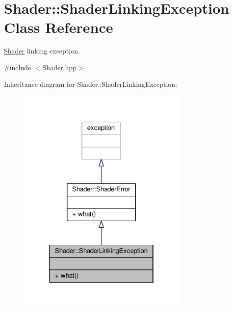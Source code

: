 \hypertarget{class_shader_1_1_shader_linking_exception}{}\section{Shader\+:\+:Shader\+Linking\+Exception Class Reference}
\label{class_shader_1_1_shader_linking_exception}


\hyperlink{class_shader}{Shader} linking exception.  




{\ttfamily \#include $<$Shader.\+hpp$>$}



Inheritance diagram for Shader\+:\+:Shader\+Linking\+Exception\+:
\nopagebreak
\begin{figure}[H]
\begin{center}
\leavevmode
\includegraphics[width=238pt]{class_shader_1_1_shader_linking_exception__inherit__graph}
\end{center}
\end{figure}


